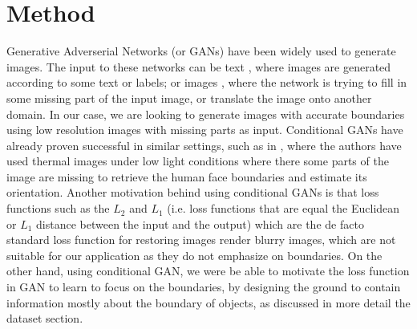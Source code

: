 \section{ Method}
Generative Adverserial Networks (or GANs) \cite{GAN} have been widely used to generate images. The input to these networks can be text \cite{text2pix, text2pix2}, where images are generated according to some text or labels; or images \cite{pix2pix, cGANberkeley, TV-GAN, deraning}, where the network is trying to fill in some missing part of the input image, or translate the image onto another domain. In our case, we are looking to generate images with accurate boundaries using low resolution images with missing parts as input. Conditional GANs have already proven successful in similar settings, such as in \cite{hams, TV-GAN}, where the authors have used thermal images under low light conditions where there some parts of the image are missing to retrieve the human face boundaries and estimate its orientation. Another motivation behind using conditional GANs is that loss functions such as the $L_2$ and $L_1$ (i.e. loss functions that are equal the Euclidean or $L_1$ distance between the input and the output) which are the de facto standard loss function for restoring images render blurry images, which are not suitable for our application as they do not emphasize on boundaries. On the other hand, using conditional GAN, we were be able to motivate the loss function in GAN to learn to focus on the boundaries, by designing the ground to contain information mostly about the boundary of objects, as discussed in more detail the dataset section.
	